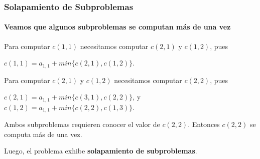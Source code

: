 \documentclass[spanish]{beamer}
\begin{document}
    \begin{frame}
        \frametitle{Solapamiento de Subproblemas}
        \framesubtitle{Veamos que algunos subproblemas se computan más de una vez}

        Para computar $c(1, 1)$ necesitamos computar $c(2, 1)$ y $c(1, 2)$, pues

        \begin{center}
            $c(1, 1) =  a_{1,1} + min\{ c(2, 1), c(1, 2)\}$.
        \end{center}

        Para computar $c(2, 1)$ y $c(1, 2)$ necesitamos computar $c(2, 2)$, pues

        \begin{center}
            $c(2, 1) =  a_{1,1} + min\{ c(3, 1), c(2, 2)\}$, y \\
            $c(1, 2) =  a_{1,1} + min\{ c(2, 2), c(1, 3)\}$.
        \end{center}

        Ambos subproblemas requieren conocer el valor de $c(2, 2)$. Entonces $c(2, 2)$ se computa más de una vez.

        \vspace{1em}

        Luego, el problema exhibe \textbf{solapamiento de subproblemas}.

    \end{frame}
\end{document}
